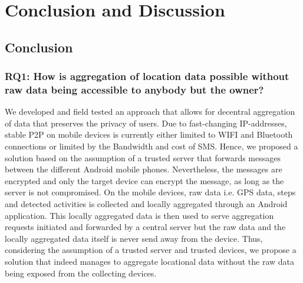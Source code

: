\chapter{Conclusion and Discussion}\label{chapter:conclusion}
\section{Conclusion}

\subsection*{RQ1: How is aggregation of location data possible without raw data being accessible to anybody but the owner?}
We developed and field tested an approach that allows for decentral aggregation of data that preserves the privacy of users. Due to fast-changing IP-addresses, stable P2P on mobile devices is currently either limited to WIFI and Bluetooth connections or limited by the Bandwidth and cost of SMS. Hence, we proposed a solution based on the assumption of a trusted server that forwards messages between the different Android mobile phones. Nevertheless, the messages are encrypted and only the target device can encrypt the message, as long as the server is not compromised. On the mobile devices, raw data i.e. GPS data, steps and detected activities is collected and locally aggregated through an Android application. This locally aggregated data is then used to serve aggregation requests initiated and forwarded by a central server but the raw data and the locally aggregated data itself is never send away from the device. Thus, considering the assumption of a trusted server and trusted devices, we propose a solution that indeed manages to aggregate locational data without the raw data being exposed from the collecting devices.

